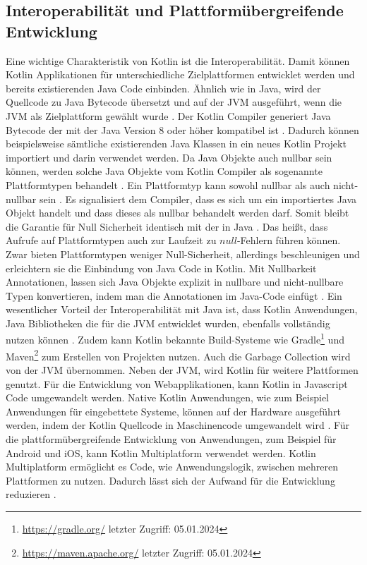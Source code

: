 \documentclass{article}
\begin{document}
\subsection{Interoperabilität und Plattformübergreifende Entwicklung}
Eine wichtige Charakteristik von Kotlin ist die Interoperabilität. Damit können Kotlin Applikationen für unterschiedliche Zielplattformen entwicklet werden und bereits existierenden Java Code einbinden. Ähnlich wie in Java, wird der Quellcode zu Java Bytecode übersetzt und auf der JVM ausgeführt, wenn die JVM als Zielplattform gewählt wurde \cite{KotlinLangDoc}. Der Kotlin Compiler generiert Java Bytecode der mit der Java Version 8 oder höher kompatibel ist \cite{KotlinLangDocFAQ}. Dadurch können beispielsweise sämtliche existierenden Java Klassen in ein neues Kotlin Projekt importiert und darin verwendet werden. Da Java Objekte auch nullbar sein können, werden solche Java Objekte vom Kotlin Compiler als sogenannte Plattformtypen behandelt \cite{Kotlin_In-D}. Ein Plattformtyp kann sowohl nullbar als auch nicht-nullbar sein \cite{Kotlin_In-D}. Es signalisiert dem Compiler, dass es sich um ein importiertes Java Objekt handelt und dass dieses als nullbar behandelt werden darf. Somit bleibt die Garantie für Null Sicherheit identisch mit der in Java \cite{Kotlin_In-D}. Das heißt, dass Aufrufe auf Plattformtypen auch zur Laufzeit zu $null$-Fehlern führen können. Zwar bieten Plattformtypen weniger Null-Sicherheit, allerdings beschleunigen und erleichtern sie die Einbindung von Java Code in Kotlin. Mit Nullbarkeit Annotationen, lassen sich Java Objekte explizit in nullbare und nicht-nullbare Typen konvertieren, indem man die Annotationen im Java-Code einfügt \cite{Kotlin_In-D}. \newline
Ein wesentlicher Vorteil der Interoperabilität mit Java ist, dass Kotlin Anwendungen, Java Bibliotheken die für die JVM entwicklet wurden, ebenfalls vollständig nutzen können \cite{KotlinLangDoc}. Zudem kann Kotlin bekannte Build-Systeme wie Gradle\footnote{\url{https://gradle.org/} letzter Zugriff: 05.01.2024} und Maven\footnote{\url{https://maven.apache.org/} letzter Zugriff: 05.01.2024} zum Erstellen von Projekten nutzen. Auch die Garbage Collection wird von der JVM übernommen. \cite{KotlinLangDoc} \newline
Neben der JVM, wird Kotlin für weitere Plattformen genutzt. Für die Entwicklung von Webapplikationen, kann Kotlin in Javascript Code umgewandelt werden. Native Kotlin Anwendungen, wie zum Beispiel Anwendungen für eingebettete Systeme, können auf der Hardware ausgeführt werden, indem der Kotlin Quellcode in Maschinencode umgewandelt wird \cite{KotlinLangDocFAQ}. \newline
Für die plattformübergreifende Entwicklung von Anwendungen, zum Beispiel für Android und iOS, kann Kotlin Multiplatform verwendet werden. Kotlin Multiplatform ermöglicht es Code, wie Anwendungslogik, zwischen mehreren Plattformen zu nutzen. Dadurch lässt sich der Aufwand für die Entwicklung reduzieren \cite{KotlinLangDocMulti}.
\end{document}
